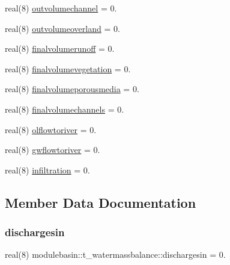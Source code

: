 \begin{DoxyCompactItemize}
\item 
real(8) \mbox{\hyperlink{structmodulebasin_1_1t__watermassbalance_a59d6fdf796d904a71d72d1b3a6e9141f}{outvolumechannel}} = 0.
\item 
real(8) \mbox{\hyperlink{structmodulebasin_1_1t__watermassbalance_ac72b37ef3b8b912054b6f03ac4cb0d1a}{outvolumeoverland}} = 0.
\item 
real(8) \mbox{\hyperlink{structmodulebasin_1_1t__watermassbalance_ae8bf6be16df869d553a0f028351f042d}{finalvolumerunoff}} = 0.
\item 
real(8) \mbox{\hyperlink{structmodulebasin_1_1t__watermassbalance_ad178ee7db2c4b019607ab9561a35188c}{finalvolumevegetation}} = 0.
\item 
real(8) \mbox{\hyperlink{structmodulebasin_1_1t__watermassbalance_ae1f8c366775a731075d95fbfe3a6783b}{finalvolumeporousmedia}} = 0.
\item 
real(8) \mbox{\hyperlink{structmodulebasin_1_1t__watermassbalance_a2425a1d5679861bc1e7c528a16dc30aa}{finalvolumechannels}} = 0.
\item 
real(8) \mbox{\hyperlink{structmodulebasin_1_1t__watermassbalance_aff1e8f1b841d75022ad2c0f0e7f95e51}{olflowtoriver}} = 0.
\item 
real(8) \mbox{\hyperlink{structmodulebasin_1_1t__watermassbalance_a91ea25920f90258d3b62d73416a3ee63}{gwflowtoriver}} = 0.
\item 
real(8) \mbox{\hyperlink{structmodulebasin_1_1t__watermassbalance_ac53edfaf9b40904d80752425abaf23d6}{infiltration}} = 0.
\end{DoxyCompactItemize}


\subsection{Member Data Documentation}
\mbox{\label{structmodulebasin_1_1t__watermassbalance_aded674ac098a06ae9fb5128497b34335}} 
\subsubsection{\texorpdfstring{dischargesin}{dischargesin}}
{\footnotesize\ttfamily real(8) modulebasin\+::t\+\_\+watermassbalance\+::dischargesin = 0.\hspace{0.3cm}{\ttfamily [private]}}


